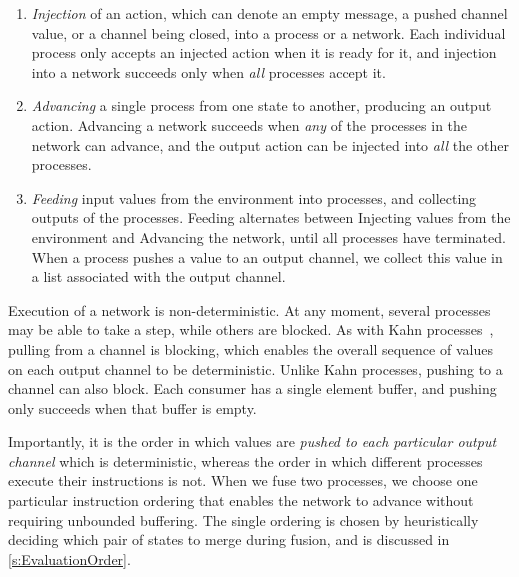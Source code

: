 \begin{enumerate}
\item \emph{Injection} of an action, which can denote an empty message, a pushed channel value, or a channel being closed, into a process or a network.
  Each individual process only accepts an injected action when it is ready for it, and injection into a network succeeds only when \emph{all} processes accept it.

\item \emph{Advancing} a single process from one state to another, producing an output action.
  Advancing a network succeeds when \emph{any} of the processes in the network can advance, and the output action can be injected into \emph{all} the other processes.

\item \emph{Feeding} input values from the environment into processes, and collecting outputs of the processes.
  Feeding alternates between Injecting values from the environment and Advancing the network, until all processes have terminated.
    When a process pushes a value to an output channel, we collect this value in a list associated with the output channel.
\end{enumerate}

Execution of a network is non-deterministic.
At any moment, several processes may be able to take a step, while others are blocked.
As with Kahn processes~\cite{kahn1976coroutines}, pulling from a channel is blocking, which enables the overall sequence of values on each output channel to be deterministic.
Unlike Kahn processes, pushing to a channel can also block.
Each consumer has a single element buffer, and pushing only succeeds when that buffer is empty.


Importantly, it is the order in which values are \emph{pushed to each particular output channel} which is deterministic, whereas the order in which different processes execute their instructions is not.
When we fuse two processes, we choose one particular instruction ordering that enables the network to advance without requiring unbounded buffering.
The single ordering is chosen by heuristically deciding which pair of states to merge during fusion, and is discussed in \cref{s:EvaluationOrder}.

